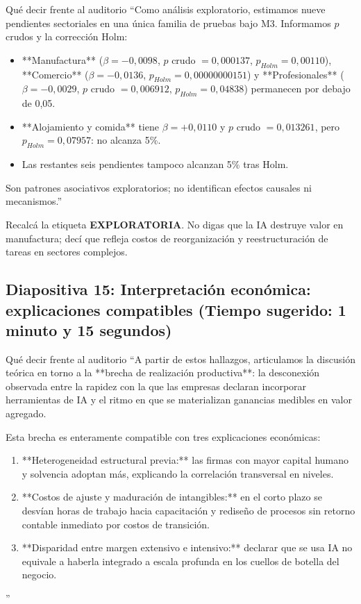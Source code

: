 \documentclass[11pt,a4paper]{article}
\begin{document}
\begin{speechbox}{Qué decir frente al auditorio}
``Como análisis exploratorio, estimamos nueve pendientes sectoriales en una única familia de pruebas bajo M3. Informamos $p$ crudos y la corrección Holm:
\begin{itemize}[itemsep=0.15em]
  \item **Manufactura** ($\beta=-0{,}0098$, $p$ crudo $=0{,}000137$, $p_{Holm}=0{,}00110$), **Comercio** ($\beta=-0{,}0136$, $p_{Holm}=0{,}00000000151$) y **Profesionales** ($\beta=-0{,}0029$, $p$ crudo $=0{,}006912$, $p_{Holm}=0{,}04838$) permanecen por debajo de 0,05.
  \item **Alojamiento y comida** tiene $\beta=+0{,}0110$ y $p$ crudo $=0{,}013261$, pero $p_{Holm}=0{,}07957$: no alcanza 5\%.
  \item Las restantes seis pendientes tampoco alcanzan 5\% tras Holm.
\end{itemize}

Son patrones asociativos exploratorios; no identifican efectos causales ni mecanismos.''
\end{speechbox}

\begin{tipbox}
Recalcá la etiqueta \textbf{EXPLORATORIA}. No digas que la IA destruye valor en manufactura; decí que refleja costos de reorganización y reestructuración de tareas en sectores complejos.
\end{tipbox}

\subsection*{Diapositiva 15: Interpretación económica: explicaciones compatibles (Tiempo sugerido: 1 minuto y 15 segundos)}

\begin{speechbox}{Qué decir frente al auditorio}
``A partir de estos hallazgos, articulamos la discusión teórica en torno a la **brecha de realización productiva**: la desconexión observada entre la rapidez con la que las empresas declaran incorporar herramientas de IA y el ritmo en que se materializan ganancias medibles en valor agregado.

Esta brecha es enteramente compatible con tres explicaciones económicas:
\begin{enumerate}[itemsep=0.15em]
  \item **Heterogeneidad estructural previa:** las firmas con mayor capital humano y solvencia adoptan más, explicando la correlación transversal en niveles.
  \item **Costos de ajuste y maduración de intangibles:** en el corto plazo se desvían horas de trabajo hacia capacitación y rediseño de procesos sin retorno contable inmediato por costos de transición.
  \item **Disparidad entre margen extensivo e intensivo:** declarar que se usa IA no equivale a haberla integrado a escala profunda en los cuellos de botella del negocio.
\end{enumerate}''
\end{speechbox}
\end{document}
